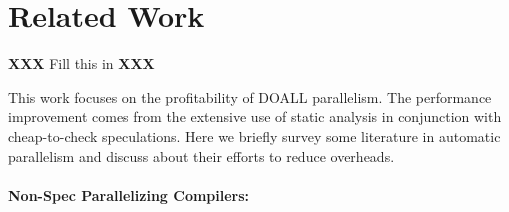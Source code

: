 \section{Related Work}

\textbf{XXX} Fill this in \textbf{XXX}






This work focuses on the profitability of DOALL parallelism. The performance
improvement comes from the extensive use of static analysis in conjunction with
cheap-to-check speculations. Here we briefly survey some literature in
automatic parallelism and discuss about their efforts to reduce overheads.

\paragraph{Non-Spec Parallelizing Compilers:}

